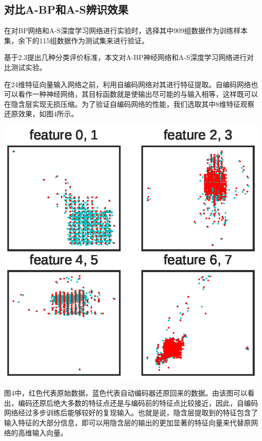 \documentclass{ctacn}%
\begin{document}
\begin{multicols}{2}
\subsection{对比A-BP和A-S辨识效果}

在对BP网络和A-S深度学习网络进行实验时，选择其中909组数据作为训练样本集，余下的115组数据作为测试集来进行验证。

基于2.3提出几种分类评价标准，本文对A-BP神经网络和A-S深度学习网络进行对比测试实验。

在24维特征向量输入网络之前，利用自编码网络对其进行特征提取。自编码网络也可以看作一种神经网络，其目标函数就是使输出尽可能的与输入相等，这样既可以在隐含层实现无损压缩。为了验证自编码网络的性能，我们选取其中8维特征观察还原效果，如图4所示。

\begin{center}
	\includegraphics[scale=0.7, trim=0 0 0 0]{figs/autoencoder_restore}\\
	\label{fig5}
\end{center}

图4中，红色代表原始数据，蓝色代表自动编码器还原回来的数据。由该图可以看出，编码还原后绝大多数的特征点还是与编码前的特征点比较接近，因此，自编码网络经过多步训练后能够较好的复现输入。也就是说，隐含层提取到的特征包含了输入特征的大部分信息，即可以用隐含层的输出的更加显著的特征向量来代替原网络的高维输入向量。


\end{multicols}
\end{document}
